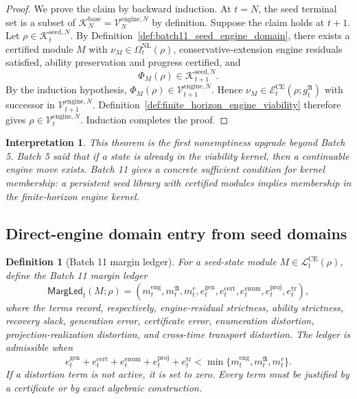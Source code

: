 \documentclass[11pt]{article}
\newtheorem{definition}[theorem]{Definition}
\newtheorem{interpretation}[theorem]{Interpretation}
\newcommand{\Ecal}{\mathcal{E}}
\newcommand{\Lcal}{\mathcal{L}}
\newcommand{\1}{\mathbf{1}}
\providecommand{\Kcal}{\mathcal{K}}
\providecommand{\Vcal}{\mathcal{V}}
\begin{document}
\begin{proof}
We prove the claim by backward induction.  At \(t=N\), the seed terminal set is a subset of \(\Kcal_N^{\mathrm{base}}=\Vcal_N^{\mathrm{engine},N}\) by definition.  Suppose the claim holds at \(t+1\).  Let \(\rho\in\Kcal_t^{\mathrm{seed},N}\).  By Definition~\ref{def:batch11_seed_engine_domain}, there exists a certified module \(M\) with \(\nu_M\in\Omega_t^{\mathrm{NL}}(\rho)\), conservative-extension engine residuals satisfied, ability preservation and progress certified, and
\[
\Phi_M(\rho)\in\Kcal_{t+1}^{\mathrm{seed},N}.
\]
By the induction hypothesis, \(\Phi_M(\rho)\in\Vcal_{t+1}^{\mathrm{engine},N}\).  Hence \(\nu_M\in\Ecal_t^{\mathrm{CE}}(\rho;g_t^{\mathfrak A})\) with successor in \(\Vcal_{t+1}^{\mathrm{engine},N}\).  Definition~\ref{def:finite_horizon_engine_viability} therefore gives \(\rho\in\Vcal_t^{\mathrm{engine},N}\).  Induction completes the proof.
\end{proof}

\begin{interpretation}
This theorem is the first nonemptiness upgrade beyond Batch 5.  Batch 5 said that if a state is already in the viability kernel, then a continuable engine move exists.  Batch 11 gives a concrete sufficient condition for kernel membership: a persistent seed library with certified modules implies membership in the finite-horizon engine kernel.
\end{interpretation}

\subsection{Direct-engine domain entry from seed domains}

\begin{definition}[Batch 11 margin ledger]
\label{def:batch11_margin_ledger}
For a seed-state module \(M\in\Lcal_t^{\mathrm{CE}}(\rho)\), define the Batch 11 margin ledger
\[
\mathsf{MargLed}_t(M;\rho)
=
(m_t^{\mathrm{eng}},m_t^{\mathfrak A},m_t^{r},e_t^{\mathrm{gen}},e_t^{\mathrm{cert}},e_t^{\mathrm{enum}},e_t^{\mathrm{proj}},e_t^{\mathrm{tr}}),
\]
where the terms record, respectively, engine-residual strictness, ability strictness, recovery slack, generation error, certificate error, enumeration distortion, projection-realization distortion, and cross-time transport distortion.  The ledger is admissible when
\[
e_t^{\mathrm{gen}}+e_t^{\mathrm{cert}}+e_t^{\mathrm{enum}}+e_t^{\mathrm{proj}}+e_t^{\mathrm{tr}}
<
\min\{m_t^{\mathrm{eng}},m_t^{\mathfrak A},m_t^{r}\}.
\]
If a distortion term is not active, it is set to zero.  Every term must be justified by a certificate or by exact algebraic construction.
\end{definition}
\end{document}
